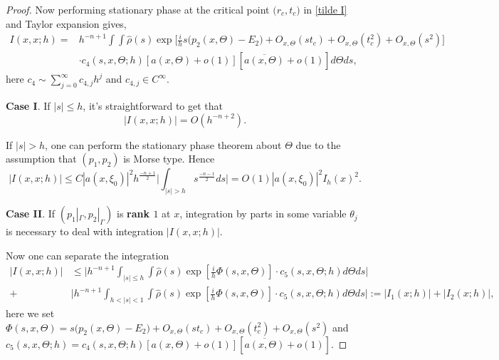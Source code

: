 \documentclass[12pt,reqno]{amsart}
\newcommand{\cs}{$\clubsuit$} %
\numberwithin{equation}{section}
\begin{document}
\begin{proof}
Now performing stationary phase at the critical point $\big(r_c, t_c \big)$ in \eqref{tilde I} and Taylor expansion gives,
\begin{align}
I (x, x; h)=&h^{-n+1}\int\int \hat{\rho}(s)  \exp\Big[\frac{i}h s\big(p_2(x, \Theta)-E_2\big)+O_{x,\Theta}(st_c) +O_{x,\Theta}(t_c^2)+O_{x,\Theta}(s^2) \Big] \nonumber\\ 
& \cdot c_4(s, x, \Theta; h) [a(x, \Theta)+o(1)] [\overline{a(x, \Theta)}+o(1)] d\Theta ds,
\end{align}
here $c_4\sim \sum_{j=0}^\infty c_{4,j} h^j$ and $c_{4,j}\in C^\infty$.


{\bf Case I}. %
If $|s|\leq h$, it's straightforward to get that
\begin{equation}
\Big| I (x, x; h) \Big|= O(h^{-n+2}).
\end{equation}

If $|s|>h$, one can perform the stationary phase theorem about $\Theta$ due to the assumption that $(p_1, p_2)$ is Morse type. Hence
\begin{equation}
\Big| I (x, x; h) \Big|\leq C |a(x,\xi_0)|^2 h^{\frac{-n+1}2} \Big|\int_{|s|>h}s^{\frac{-n-1}2} ds\Big|=O(1) |a(x,\xi_0)|^2 I_h(x)^2.
\end{equation}


{\bf Case II}. If $(p_1|_{\Gamma}, p_2|_{\Gamma})$ is {\bf rank $1$} at $x$, integration by parts in some variable $\theta_j$ is necessary to deal with integration $|{I} (x,x; h)|$. 

Now one can separate the integration
\begin{align*}
\Big| I (x, x; h) \Big|& \leq \Big|h^{-n+1}\int_{|s|\leq h} \int \hat{\rho}(s)  \exp[\frac{i}h\Phi(s,x,\Theta) ] \cdot c_5(s, x, \Theta; h)d\Theta ds \Big| \nonumber \\
+& \Big|h^{-n+1}\int_{h<|s|<1}\int \hat{\rho}(s)  \exp[\frac{i}h\Phi(s,x,\Theta) ] \cdot c_5(s, x, \Theta; h)d\Theta ds\Big|
:=\Big| {I}_1 (x; h)\Big| + \Big| {I}_2 (x; h) \Big|,
\end{align*}
here we set $\Phi(s,x,\Theta)= s\big(p_2(x, \Theta)-E_2\big)+O_{x,\Theta}(st_c) +O_{x,\Theta}(t_c^2)+O_{x,\Theta}(s^2)$ and $c_5(s, x, \Theta; h)=c_4(s, x, \Theta; h) [a(x, \Theta)+o(1)] [\overline{a(x, \Theta)}+o(1)]$.


\end{proof}
\end{document}
